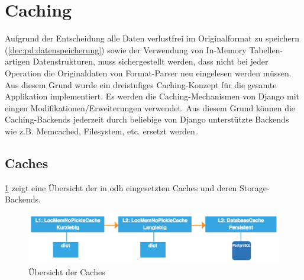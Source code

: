 
\section{Caching}
Aufgrund der Entscheidung alle Daten verlustfrei im Originalformat zu speichern (\cref{dec:pd:datenspeicherung}) sowie der Verwendung von In-Memory Tabellen-artigen Datenstrukturen, muss sichergestellt werden, dass nicht bei jeder Operation die Originaldaten von Format-Parser neu eingelesen werden müssen.\\

Aus diesem Grund wurde ein dreistufiges Caching-Konzept für die gesamte Applikation implementiert. Es werden die Caching-Mechanismen von Django mit eingen Modifikationen/Erweiterungen verwendet. Aus diesem Grund können die Caching-Backends jederzeit durch beliebige von Django unterstützte Backends wie z.B. Memcached, Filesystem, etc. ersetzt werden.

\subsection{Caches}

\cref{fig:pd:caches} zeigt eine Übersicht der in \gls{odh} eingesetzten Caches und deren Storage-Backends.

\begin{figure}[H]
\centering
\includegraphics[width=\linewidth]{fig/caching.pdf}
\caption{Übersicht der Caches}
\label{fig:pd:caches}
\end{figure}


